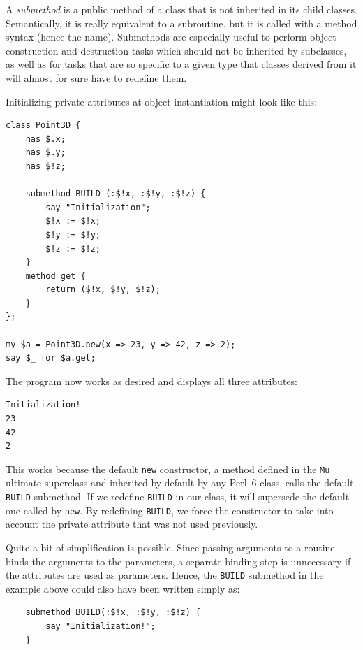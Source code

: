 A \emph{submethod} is a public method of a class that is not inherited 
in its child classes. Semantically, it is really equivalent 
to a subroutine, but it is called with a method syntax (hence 
the name). Submethods are especially useful to perform object 
construction and destruction tasks which should not be 
inherited by subclasses, as well as for tasks that are 
so specific to a given type that classes derived from it  
will almost for sure have to redefine them.

Initializing private attributes at object instantiation 
might look like this:

\begin{verbatim}
class Point3D {
    has $.x;
    has $.y;
    has $!z;

    submethod BUILD (:$!x, :$!y, :$!z) {
    	say "Initialization";
        $!x := $!x; 
        $!y := $!y; 
        $!z := $!z;
    }
    method get {
        return ($!x, $!y, $!z);
    }
};

my $a = Point3D.new(x => 23, y => 42, z => 2);
say $_ for $a.get;
\end{verbatim}

The program now works as desired and displays all 
three attributes:

\begin{verbatim}
Initialization!
23
42
2
\end{verbatim}

This works because the default {\tt new} constructor, a method 
defined in the {\tt Mu} ultimate superclass and inherited by 
default by any Perl~6 class, calls 
the default {\tt BUILD} submethod. If we redefine {\tt BUILD} 
in our class, it will supersede the default one 
called by {\tt new}. By redefining {\tt BUILD}, we force 
the constructor to take into account the private attribute that 
was not used previously.

Quite a bit of simplification is possible. Since passing arguments 
to a routine binds the arguments to the parameters, a separate 
binding step is unnecessary if the attributes are used as 
parameters. Hence, the {\tt BUILD} submethod in the example 
above could also have been written simply as:

\begin{verbatim}
    submethod BUILD(:$!x, :$!y, :$!z) {
        say "Initialization!";
    }
\end{verbatim}



